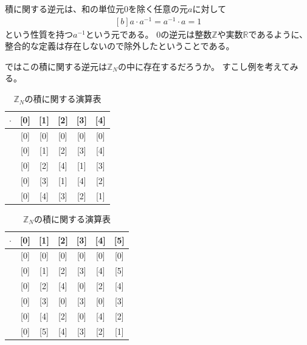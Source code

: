 \documentclass[../master.tex]{subfiles}
\begin{document}
積に関する逆元は、和の単位元$0$を除く任意の元$a$に対して
\begin{equation}\begin{aligned}[b]
    a \cdot a^{-1} = a^{-1} \cdot a = 1
\end{aligned}\end{equation}
という性質を持つ$a^{-1}$という元である。
$0$の逆元は整数$\mathbb{Z}$や実数$\mathbb{R}$であるように、
整合的な定義は存在しないので除外したということである。

ではこの積に関する逆元は$\mathbb{Z}_N$の中に存在するだろうか。
すこし例を考えてみる。
\begin{table}
    \centering
    \caption{$\mathbb{Z}_N$の積に関する演算表}
    \label{table:chap2_ZN_product}
    \begin{minipage}{0.4 \columnwidth}
        \centering
        \label{table:chap2_Z5_product}
        \begin{tabular}{c|ccccc}
            \hline
            $\cdot$ & [0] & [1] & [2] & [3] & [4]\\
            \hline
            [0] & [0] & [0] & [0] & [0] & [0]\\ \relax
            [1] & [0] & [1] & [2] & [3] & [4]\\ \relax
            [2] & [0] & [2] & [4] & [1] & [3]\\ \relax
            [3] & [0] & [3] & [1] & [4] & [2]\\ \relax
            [4] & [0] & [4] & [3] & [2] & [1]\\
            \hline
        \end{tabular}
    \end{minipage}
    \begin{minipage}{0.4 \columnwidth}
        \centering
        \label{table:chap2_Z6_product}
        \begin{tabular}{c|cccccc}
            \hline
            $\cdot$ & [0] & [1] & [2] & [3] & [4] & [5]\\
            \hline
            [0] & [0] & [0] & [0] & [0] & [0] & [0]\\ \relax
            [1] & [0] & [1] & [2] & [3] & [4] & [5]\\ \relax
            [2] & [0] & [2] & [4] & [0] & [2] & [4]\\ \relax
            [3] & [0] & [3] & [0] & [3] & [0] & [3]\\ \relax
            [4] & [0] & [4] & [2] & [0] & [4] & [2]\\ \relax
            [5] & [0] & [5] & [4] & [3] & [2] & [1]\\
            \hline
        \end{tabular}
    \end{minipage}
\end{table}
\end{document}
